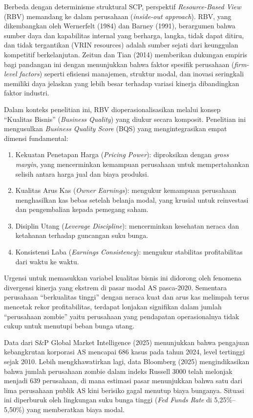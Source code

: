 \documentclass[12pt,a4paper]{report}
\begin{document}
Berbeda dengan determinisme struktural SCP, perspektif \textit{Resource-Based View} (RBV) memandang ke dalam perusahaan (\textit{inside-out approach}). RBV, yang dikembangkan oleh Wernerfelt (1984) dan Barney (1991), berargumen bahwa sumber daya dan kapabilitas internal yang berharga, langka, tidak dapat ditiru, dan tidak tergantikan (VRIN resources) adalah sumber sejati dari keunggulan kompetitif berkelanjutan. Zeitun dan Tian (2014) memberikan dukungan empiris bagi pandangan ini dengan menunjukkan bahwa faktor spesifik perusahaan (\textit{firm-level factors}) seperti efisiensi manajemen, struktur modal, dan inovasi seringkali memiliki daya jelaskan yang lebih besar terhadap variasi kinerja dibandingkan faktor industri.

Dalam konteks penelitian ini, RBV dioperasionalisasikan melalui konsep ``Kualitas Bisnis'' (\textit{Business Quality}) yang diukur secara komposit. Penelitian ini mengusulkan \textit{Business Quality Score} (BQS) yang mengintegrasikan empat dimensi fundamental:

\begin{enumerate}
    \item Kekuatan Penetapan Harga (\textit{Pricing Power}): diproksikan dengan \textit{gross margin}, yang mencerminkan kemampuan perusahaan untuk mempertahankan selisih antara harga jual dan biaya produksi.
    \item Kualitas Arus Kas (\textit{Owner Earnings}): mengukur kemampuan perusahaan menghasilkan kas bebas setelah belanja modal, yang krusial untuk reinvestasi dan pengembalian kepada pemegang saham.
    \item Disiplin Utang (\textit{Leverage Discipline}): mencerminkan kesehatan neraca dan ketahanan terhadap guncangan suku bunga.
    \item Konsistensi Laba (\textit{Earnings Consistency}): mengukur stabilitas profitabilitas dari waktu ke waktu.
\end{enumerate}

Urgensi untuk memasukkan variabel kualitas bisnis ini didorong oleh fenomena divergensi kinerja yang ekstrem di pasar modal AS pasca-2020. Sementara perusahaan ``berkualitas tinggi'' dengan neraca kuat dan arus kas melimpah terus mencetak rekor profitabilitas, terdapat lonjakan signifikan dalam jumlah ``perusahaan zombie'' yaitu perusahaan yang pendapatan operasionalnya tidak cukup untuk menutupi beban bunga utang.

Data dari S\&P Global Market Intelligence (2025) menunjukkan bahwa pengajuan kebangkrutan korporasi AS mencapai 686 kasus pada tahun 2024, level tertinggi sejak 2010. Lebih mengkhawatirkan lagi, data Bloomberg (2025) mengindikasikan bahwa jumlah perusahaan zombie dalam indeks Russell 3000 telah melonjak menjadi 639 perusahaan, di mana estimasi pasar menunjukkan bahwa satu dari lima perusahaan publik AS kini berisiko gagal menutup biaya bunganya. Situasi ini diperburuk oleh lingkungan suku bunga tinggi (\textit{Fed Funds Rate} di 5,25\%--5,50\%) yang memberatkan biaya modal.
\end{document}
